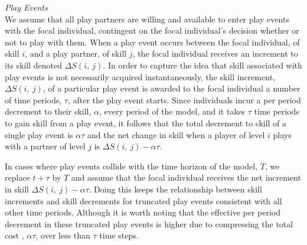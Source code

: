 \documentclass[12pt, letterpaper, fleqn]{article}
\begin{document}
	\noindent \textit{Play Events}\\
	We assume that all play partners are willing and available to enter play events with the focal individual, contingent on the focal individual's decision whether or not to play with them.  
	When a play event occurs between the focal individual, of skill $i$, and a play partner, of skill $j$, the focal individual receives an increment to its skill denoted $\Delta S(i,~j)$. %
	In order to capture the idea that skill associated with play events is not necessarily acquired instantaneously, the skill increment, $\Delta S(i,~j)$, of a particular play event is awarded to the focal individual a number of time periods, $\tau$, after the play event starts.
	Since individuals incur a per period decrement to their skill, $\alpha$, every period of the model, and it takes $\tau$ time periods to gain skill from a play event, it follows that the total decrement to skill of a single play event is $\alpha \tau$ and the net change in skill when a player of level $i$ plays with a partner of level $j$ is $\Delta S(i,~j)-\alpha \tau$. %
	
	
	In cases where play events collide with the time horizon of the model, $T$, we replace $t+\tau$ by $T$ and assume that the focal individual receives the net increment in skill $\Delta S(i,~j)-\alpha \tau$.
	Doing this keeps the relationship between skill increments and skill decrements for truncated play events consistent with all other time periods.
	Although it is worth noting that the effective per period decrement in these truncated play events is higher due to compressing the total cost , $\alpha\tau$, over less than $\tau$ time steps.
	\\
	
\end{document}
